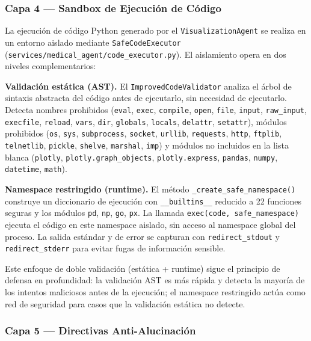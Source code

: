 \subsubsection{Capa 4 — Sandbox de Ejecución de Código}
\label{sec:sandbox}

La ejecución de código Python generado por el \texttt{VisualizationAgent} se realiza en un entorno aislado mediante \texttt{SafeCodeExecutor} (\texttt{services/medical\_agent/code\_executor.py}). El aislamiento opera en dos niveles complementarios:

\textbf{Validación estática (AST).} El \texttt{ImprovedCodeValidator} analiza el árbol de sintaxis abstracta del código antes de ejecutarlo, sin necesidad de ejecutarlo. Detecta nombres prohibidos (\texttt{eval}, \texttt{exec}, \texttt{compile}, \texttt{open}, \texttt{file}, \texttt{input}, \texttt{raw\_input}, \texttt{execfile}, \texttt{reload}, \texttt{vars}, \texttt{dir}, \texttt{globals}, \texttt{locals}, \texttt{delattr}, \texttt{setattr}), módulos prohibidos (\texttt{os}, \texttt{sys}, \texttt{subprocess}, \texttt{socket}, \texttt{urllib}, \texttt{requests}, \texttt{http}, \texttt{ftplib}, \texttt{telnetlib}, \texttt{pickle}, \texttt{shelve}, \texttt{marshal}, \texttt{imp}) y módulos no incluidos en la lista blanca (\texttt{plotly}, \texttt{plotly.graph\_objects}, \texttt{plotly.express}, \texttt{pandas}, \texttt{numpy}, \texttt{datetime}, \texttt{math}).

\textbf{Namespace restringido (runtime).} El método \texttt{\_create\_safe\_namespace()} construye un diccionario de ejecución con \texttt{\_\_builtins\_\_} reducido a 22 funciones seguras y los módulos \texttt{pd}, \texttt{np}, \texttt{go}, \texttt{px}. La llamada \texttt{exec(code, safe\_namespace)} ejecuta el código en este namespace aislado, sin acceso al namespace global del proceso. La salida estándar y de error se capturan con \texttt{redirect\_stdout} y \texttt{redirect\_stderr} para evitar fugas de información sensible.

Este enfoque de doble validación (estática + runtime) sigue el principio de defensa en profundidad: la validación AST es más rápida y detecta la mayoría de los intentos maliciosos antes de la ejecución; el namespace restringido actúa como red de seguridad para casos que la validación estática no detecte.


\subsubsection{Capa 5 — Directivas Anti-Alucinación}
\label{sec:antihallucination_310}

